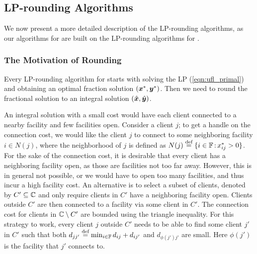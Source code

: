 \documentclass[oneside,final]{ucr}
\begin{document}
\subsection{LP-rounding Algorithms}
We now present a more detailed description of the
LP-rounding algorithms, as our algorithms for {\FTFP} are
built on the LP-rounding algorithms for {\UFL}.

\subsubsection{The Motivation of Rounding}
Every LP-rounding algorithm for {\UFL} starts with solving
the LP (\ref{eqn:ufl_primal}) and obtaining an optimal
fraction solution $(\boldsymbol{x}^\ast,\boldsymbol{y}^\ast)$. Then we need to
round the fractional solution to an integral solution
$(\hat{\boldsymbol{x}},\hat{\boldsymbol{y}})$.

An integral solution with a small cost would have each
client connected to a nearby facility and few facilities
open. Consider a client $j$; to get a handle on the
connection cost, we would like the client $j$ to connect to
some neighboring facility $i\in N(j)$, where the
neighborhood of $j$ is defined as $N(j) \stackrel{\text{def}}{=}
\{i\in\mathbb{F} {\,:\,} x_{ij}^\ast > 0\}$. For the sake
of the connection cost, it is desirable that every client
has a neighboring facility open, as those are facilities not
too far away. However, this is in general not possible, or
we would have to open too many facilities, and thus incur a
high facility cost. An alternative is to select a subset of
clients, denoted by $C' \subseteq \mathbb{C}$ and only
require clients in $C'$ have a neighboring facility
open. Clients outside $C'$ are then connected to a facility
via some client in $C'$. The connection cost for clients in
$\mathbb{C} \setminus C'$ are bounded using the triangle
inequality. For this strategy to work, every client $j$
outside $C'$ needs to be able to find some client $j'$ in
$C'$ such that both $d_{jj'} \stackrel{\text{def}}{=} \min_{i\in \mathbb{F}}
d_{ij} + d_{ij'}$ and $d_{\phi(j') j'}$ are small. Here
$\phi(j')$ is the facility that $j'$ connects to.
\end{document}

